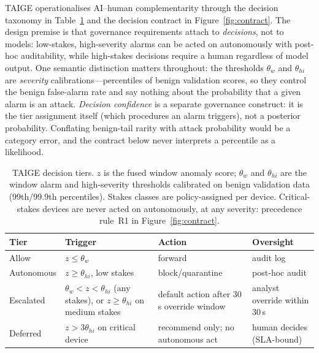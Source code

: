 \documentclass[sigconf,review,anonymous]{acmart}
\begin{document}
TAIGE operationalises AI--human complementarity through the decision taxonomy in Table~\ref{tab:tiers} and the decision contract in Figure~\ref{fig:contract}. The design premise is that governance requirements attach to \emph{decisions}, not to models: low-stakes, high-severity alarms can be acted on autonomously with post-hoc auditability, while high-stakes decisions require a human regardless of model output. One semantic distinction matters throughout: the thresholds $\theta_w$ and $\theta_{hi}$ are \emph{severity} calibrations---percentiles of benign validation scores, so they control the benign false-alarm rate and say nothing about the probability that a given alarm is an attack. \emph{Decision confidence} is a separate governance construct: it is the tier assignment itself (which procedures an alarm triggers), not a posterior probability. Conflating benign-tail rarity with attack probability would be a category error, and the contract below never interprets a percentile as a likelihood.

\begin{table}[t]
\caption{TAIGE decision tiers. $z$ is the fused window anomaly score; $\theta_w$ and $\theta_{hi}$ are the window alarm and high-severity thresholds calibrated on benign validation data (99th/99.9th percentiles). Stakes classes are policy-assigned per device. Critical-stakes devices are never acted on autonomously, at any severity: precedence rule~R1 in Figure~\ref{fig:contract}.}
\label{tab:tiers}
\small
\begin{tabular}{@{}llll@{}}
\toprule
Tier & Trigger & Action & Oversight \\
\midrule
Allow & $z \le \theta_w$ & forward & audit log \\
Autonomous & $z \ge \theta_{hi}$, low stakes & block/quarantine & post-hoc audit \\
Escalated & $\theta_w < z < \theta_{hi}$ (any stakes), or $z \ge \theta_{hi}$ on medium stakes & default action after 30\,s override window & analyst override within 30\,s \\
Deferred & $z > 3\theta_{hi}$ on critical device & recommend only; no autonomous act & human decides (SLA-bound) \\
\bottomrule
\end{tabular}
\end{table}
\end{document}
